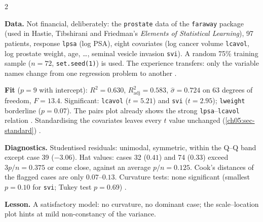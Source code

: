 \begin{paracol}{2}
\begin{casestudy}
\textbf{Data.} Not financial, deliberately: the \texttt{prostate} data of the \texttt{faraway} package (used in Hastie,
Tibshirani and Friedman's \emph{Elements of Statistical Learning}), 97 patients, response \texttt{lpsa} (log PSA), eight
covariates (log cancer volume \texttt{lcavol}, log prostate weight, age, \dots, seminal vesicle invasion \texttt{svi}).
A random 75\% training sample ($n=72$, \texttt{set.seed(1)}) is used. The experience transfers: only the variable
names change from one regression problem to another .

\textbf{Fit} ($p=9$ with intercept): $R^2=0.630$, $R^2_{\text{adj}}=0.583$, $\hat\sigma=0.724$ on 63 degrees of freedom,
$F=13.4$. Significant: \texttt{lcavol} ($t=5.21$) and \texttt{svi} ($t=2.95$); \texttt{lweight} borderline ($p=0.07$). The pairs
plot already shows the strong \texttt{lpsa}--\texttt{lcavol} relation . Standardising the covariates
leaves every $t$ value unchanged (\cref{ch05:sec-standard}) .

\textbf{Diagnostics.} Studentised residuals: unimodal, symmetric, within the Q--Q band except case 39 ($-3.06$). Hat
values: cases 32 ($0.41$) and 74 ($0.33$) exceed $3p/n=0.375$ or come close, against an average $p/n=0.125$. Cook's
distances of the flagged cases are only $0.07$--$0.13$. Curvature tests: none significant (smallest $p=0.10$ for
\texttt{svi}; Tukey test $p=0.69$) .

\textbf{Lesson.} A satisfactory model: no curvature, no dominant case; the scale--location plot hints at mild
non-constancy of the variance.
\end{casestudy}


\end{paracol}
